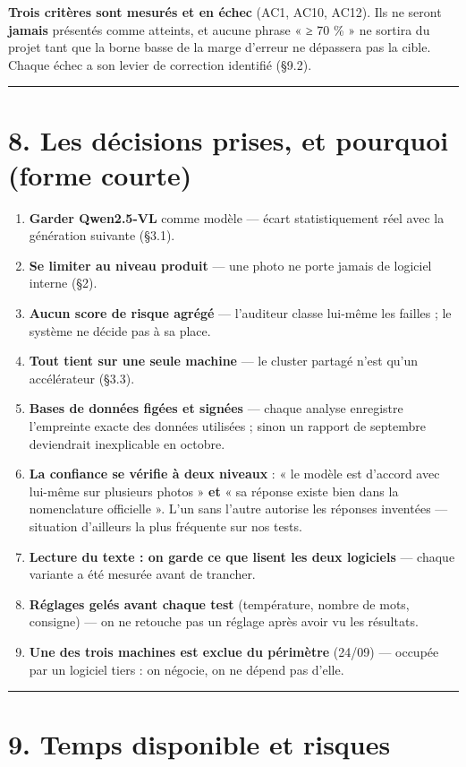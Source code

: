 \documentclass[11pt,a4paper]{article}
\begin{document}
\textbf{Trois critères sont mesurés et en échec} (AC1, AC10, AC12). Ils ne seront \textbf{jamais} présentés comme atteints, et aucune phrase « ≥ 70 \% » ne sortira du projet tant que la borne basse de la marge d'erreur ne dépassera pas la cible. Chaque échec a son levier de correction identifié (§9.2).

\medskip\hrule\medskip
\section*{8. Les décisions prises, et pourquoi (forme courte)}
\begin{enumerate}  \item \textbf{Garder Qwen2.5-VL} comme modèle — écart statistiquement réel avec la génération suivante (§3.1).
  \item \textbf{Se limiter au niveau produit} — une photo ne porte jamais de logiciel interne (§2).
  \item \textbf{Aucun score de risque agrégé} — l'auditeur classe lui-même les failles ; le système ne décide pas à sa place.
  \item \textbf{Tout tient sur une seule machine} — le cluster partagé n'est qu'un accélérateur (§3.3).
  \item \textbf{Bases de données figées et signées} — chaque analyse enregistre l'empreinte exacte des données utilisées ; sinon un rapport de septembre deviendrait inexplicable en octobre.
  \item \textbf{La confiance se vérifie à deux niveaux} : « le modèle est d'accord avec lui-même sur plusieurs photos » \textbf{et} « sa réponse existe bien dans la nomenclature officielle ». L'un sans l'autre autorise les réponses inventées — situation d'ailleurs la plus fréquente sur nos tests.
  \item \textbf{Lecture du texte : on garde ce que lisent les deux logiciels} — chaque variante a été mesurée avant de trancher.
  \item \textbf{Réglages gelés avant chaque test} (température, nombre de mots, consigne) — on ne retouche pas un réglage après avoir vu les résultats.
  \item \textbf{Une des trois machines est exclue du périmètre} (24/09) — occupée par un logiciel tiers : on négocie, on ne dépend pas d'elle.
\end{enumerate}

\medskip\hrule\medskip
\section*{9. Temps disponible et risques}
\end{document}
